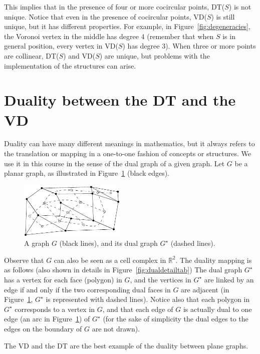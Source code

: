This implies that in the presence of four or more cocircular points, DT($S$) is not unique. 
Notice that even in the presence of cocircular points, VD($S$) is still unique, but it has different properties. 
For example, in Figure~\ref{fig:degeneracies}, the Voronoi vertex in the middle has degree 4 (remember that when $S$ is in general position, every vertex in VD($S$) has degree 3). 
When three or more points are collinear, DT($S$) and VD($S$) are unique, but problems with the implementation of the structures can arise.


%
\section{Duality between the DT and the VD}
\label{sec:duality}

Duality can have many different meanings in mathematics, but it always refers to the translation or mapping in a one-to-one fashion of concepts or structures. 
We use it in this course in the sense of the dual graph of a given graph. 
Let $G$ be a planar graph, as illustrated in Figure~\ref{fig:dual_graph} (black edges).
\begin{figure}
  \centering
  \includegraphics[width=0.45\textwidth]{figs/dual_graph}
  \caption{A graph $G$ (black lines), and its dual graph $G^\star$ (dashed lines).}
\label{fig:dual_graph}
\end{figure}
Observe that $G$ can also be seen as a cell complex in $\mathbb{R}^{2}$. 
The duality mapping is as follows (also shown in details in Figure~\ref{fig:dualdetailtab})
The dual graph $G^{\star}$ has a vertex for each face (polygon) in $G$, and the vertices in $G^{\star}$ are linked by an edge if and only if the two corresponding dual faces in $G$ are adjacent (in Figure~\ref{fig:dual_graph}, $G^{\star}$ is represented with dashed lines). 
Notice also that each polygon in $G^{\star}$ corresponds to a vertex in $G$, and that each edge of $G$ is actually dual to one edge (an arc in Figure~\ref{fig:dual_graph}) of $G^{\star}$ (for the sake of simplicity the dual edges to the edges on the boundary of $G$ are not drawn).

The VD and the DT are the best example of the duality between plane graphs.

